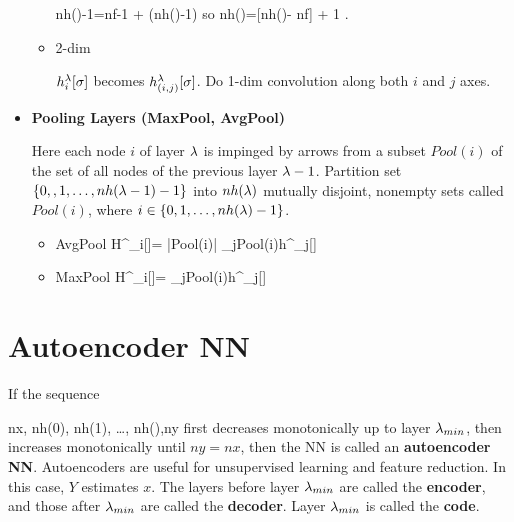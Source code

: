 \begin{itemize}
\begin{itemize}
\beq
nh()-1=nf-1 +
(nh(\lam)-1)\sigma
\;
\eeq
so
\beq
nh(\lam)=[nh()-
nf] + 1
\;.
\eeq
\item 2-dim

$h_i^\lambda[\sigma]$ becomes
$h_{(i,j)}^\lambda[\sigma]$.
Do 1-dim convolution
along both $i$ and $j$ axes.

\end{itemize}
\item{\bf Pooling Layers 
(MaxPool, AvgPool)}

Here each node $i$ 
of layer $\lambda$ is impinged by
arrows from  a subset $Pool(i)$
of the set of all
nodes of the previous layer $\lambda-1$.
Partition set
$\{0,,1,\dots,nh(\lambda-1)-1\}
$ into $nh(\lambda)$ mutually
disjoint, nonempty sets
called $Pool(i)$, where
$i\in \{0, 1, \ldots,nh(\lambda)-1\}$.

\begin{itemize}
\item AvgPool
\beq
H^\lam_i[\sigma]=
{|Pool(i)|}
\sum_{j\in Pool(i)}h^{}_j[\sigma]
\eeq
\item MaxPool
\beq
H^\lam_i[\sigma]=
\max_{j\in Pool(i)}h^{}_j[\sigma]
\eeq

\end{itemize}


\end{itemize}

\section{Autoencoder NN}


If the sequence 

\beq
nx, nh(0), nh(1), \ldots,
nh(),ny
\eeq
first decreases monotonically 
up to layer $\lambda_{min}$, then
increases monotonically until
$ny=nx$, then
the NN is called an {\bf
autoencoder NN}.
Autoencoders
are  useful for unsupervised learning
and
feature reduction. In this case,
$Y$ estimates $x$.
The layers before
layer $\lambda_{min}$
are called the {\bf encoder},
and those after 
$\lambda_{min}$ are called the 
{\bf decoder}.
Layer $\lambda_{min}$
is called the {\bf code}.



